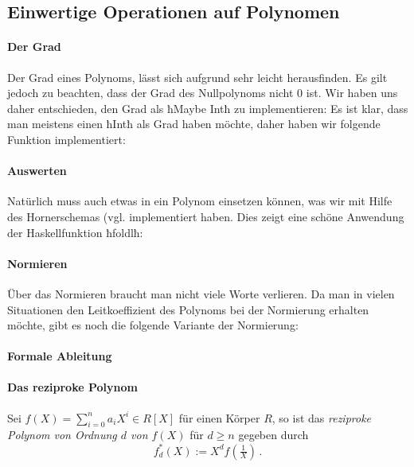 \subsection{Einwertige Operationen auf Polynomen}

\paragraph{Der Grad} Der Grad eines Polynoms, lässt sich aufgrund 
 sehr leicht herausfinden. Es gilt jedoch zu beachten, dass der
Grad des Nullpolynoms nicht $0$ ist. Wir haben uns daher entschieden, den Grad
als ħMaybe Intħ zu implementieren:
Es ist klar, dass man meistens einen ħIntħ als Grad haben möchte, daher haben
wir folgende Funktion implementiert:

\paragraph{Auswerten} Natürlich muss auch etwas in ein Polynom einsetzen
können, was wir mit Hilfe des Hornerschemas (vgl. \autocite{wiki:horner-schema}
implementiert haben. Dies zeigt eine schöne Anwendung der Haskellfunktion 
ħfoldlħ:


\paragraph{Normieren} Über das Normieren braucht man nicht viele Worte
verlieren.
Da man in vielen Situationen den Leitkoeffizient des Polynoms bei der
Normierung erhalten möchte, gibt es noch die folgende Variante der Normierung:

\paragraph{Formale Ableitung} 

\paragraph{Das reziproke Polynom} 
\begin{definition}
  \label{def:reziprokesPoly}
  Sei $f(X) = \sum_{i=0}^n a_i X^i \in R[X]$ für einen Körper $R$, so ist 
  das \emph{reziproke Polynom von Ordnung $d$ von $f(X)$} für $d \geq n$ 
  gegeben durch
  \[ f^\ast_d(X) := X^d f(\tfrac{1}{X})\,.\]
\end{definition}

